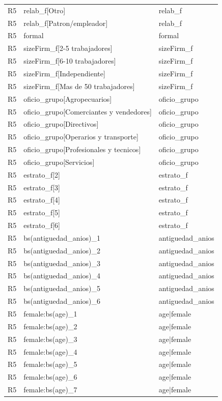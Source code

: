 \begin{longtable}{lll}
R5 & relab\_f[Otro] & relab\_f \\
R5 & relab\_f[Patron/empleador] & relab\_f \\
R5 & formal & formal \\
R5 & sizeFirm\_f[2-5 trabajadores] & sizeFirm\_f \\
R5 & sizeFirm\_f[6-10 trabajadores] & sizeFirm\_f \\
R5 & sizeFirm\_f[Independiente] & sizeFirm\_f \\
R5 & sizeFirm\_f[Mas de 50 trabajadores] & sizeFirm\_f \\
R5 & oficio\_grupo[Agropecuarios] & oficio\_grupo \\
R5 & oficio\_grupo[Comerciantes y vendedores] & oficio\_grupo \\
R5 & oficio\_grupo[Directivos] & oficio\_grupo \\
R5 & oficio\_grupo[Operarios y transporte] & oficio\_grupo \\
R5 & oficio\_grupo[Profesionales y tecnicos] & oficio\_grupo \\
R5 & oficio\_grupo[Servicios] & oficio\_grupo \\
R5 & estrato\_f[2] & estrato\_f \\
R5 & estrato\_f[3] & estrato\_f \\
R5 & estrato\_f[4] & estrato\_f \\
R5 & estrato\_f[5] & estrato\_f \\
R5 & estrato\_f[6] & estrato\_f \\
R5 & bs(antiguedad\_anios)\_1 & antiguedad\_anios \\
R5 & bs(antiguedad\_anios)\_2 & antiguedad\_anios \\
R5 & bs(antiguedad\_anios)\_3 & antiguedad\_anios \\
R5 & bs(antiguedad\_anios)\_4 & antiguedad\_anios \\
R5 & bs(antiguedad\_anios)\_5 & antiguedad\_anios \\
R5 & bs(antiguedad\_anios)\_6 & antiguedad\_anios \\
R5 & female:bs(age)\_1 & age|female \\
R5 & female:bs(age)\_2 & age|female \\
R5 & female:bs(age)\_3 & age|female \\
R5 & female:bs(age)\_4 & age|female \\
R5 & female:bs(age)\_5 & age|female \\
R5 & female:bs(age)\_6 & age|female \\
R5 & female:bs(age)\_7 & age|female \\

\end{longtable}
